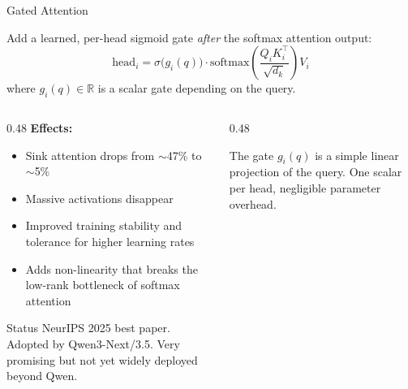 \begin{frame}{Gated Attention~\cite{qiu2025gatedattention}}

  Add a learned, per-head sigmoid gate \emph{after} the softmax attention output:
  \[
    \text{head}_i = \sigma\!\bigl(g_i(q)\bigr) \cdot \text{softmax}\!\left(\frac{Q_i K_i^\top}{\sqrt{d_k}}\right) V_i
  \]
  where $g_i(q) \in \mathbb{R}$ is a scalar gate depending on the query.

  \vspace{0.3em}
  \begin{columns}[T]
    \begin{column}{0.48\textwidth}
      \textbf{Effects:}
      \begin{itemize}
        \item Sink attention drops from $\sim$47\% to $\sim$5\%
        \item Massive activations disappear
        \item Improved training stability and tolerance for higher learning rates
        \item Adds non-linearity that breaks the low-rank bottleneck of softmax attention
      \end{itemize}

      \vspace{0.3em}
      \begin{alertblock}{\small Status}
        NeurIPS 2025 best paper.
        Adopted by Qwen3-Next/3.5.
        Very promising but not yet widely deployed beyond Qwen.
      \end{alertblock}
    \end{column}
    \begin{column}{0.48\textwidth}
      \centering

      \vspace{0.3em}
      {\footnotesize The gate $g_i(q)$ is a simple linear projection of the query. One scalar per head, negligible parameter overhead.}
    \end{column}
  \end{columns}
\end{frame}

